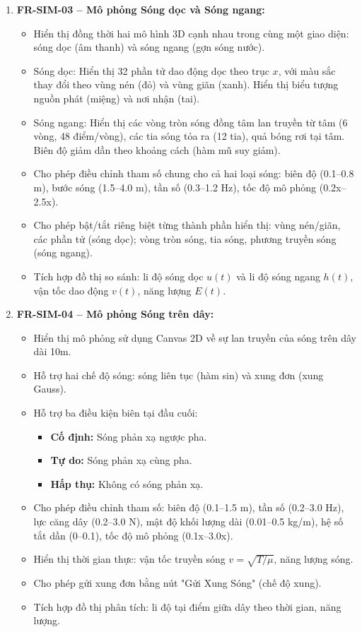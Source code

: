 \begin{enumerate}
    \item \textbf{FR-SIM-03 – Mô phỏng Sóng dọc và Sóng ngang:}
    \begin{itemize}
        \item Hiển thị đồng thời hai mô hình 3D cạnh nhau trong cùng một giao diện: sóng dọc (âm thanh) và sóng ngang (gợn sóng nước).
        \item Sóng dọc: Hiển thị 32 phần tử dao động dọc theo trục $x$, với màu sắc thay đổi theo vùng nén (đỏ) và vùng giãn (xanh). Hiển thị biểu tượng nguồn phát (miệng) và nơi nhận (tai).
        \item Sóng ngang: Hiển thị các vòng tròn sóng đồng tâm lan truyền từ tâm (6 vòng, 48 điểm/vòng), các tia sóng tỏa ra (12 tia), quả bóng rơi tại tâm. Biên độ giảm dần theo khoảng cách (hàm mũ suy giảm).
        \item Cho phép điều chỉnh tham số chung cho cả hai loại sóng: biên độ (0.1–0.8 m), bước sóng (1.5–4.0 m), tần số (0.3–1.2 Hz), tốc độ mô phỏng (0.2x–2.5x).
        \item Cho phép bật/tắt riêng biệt từng thành phần hiển thị: vùng nén/giãn, các phần tử (sóng dọc); vòng tròn sóng, tia sóng, phương truyền sóng (sóng ngang).
        \item Tích hợp đồ thị so sánh: li độ sóng dọc $u(t)$ và li độ sóng ngang $h(t)$, vận tốc dao động $v(t)$, năng lượng $E(t)$.
    \end{itemize}
    
    \item \textbf{FR-SIM-04 – Mô phỏng Sóng trên dây:}
    \begin{itemize}
        \item Hiển thị mô phỏng sử dụng Canvas 2D về sự lan truyền của sóng trên dây dài 10m.
        \item Hỗ trợ hai chế độ sóng: sóng liên tục (hàm sin) và xung đơn (xung Gauss).
        \item Hỗ trợ ba điều kiện biên tại đầu cuối:
        \begin{itemize}
            \item \textbf{Cố định:} Sóng phản xạ ngược pha.
            \item \textbf{Tự do:} Sóng phản xạ cùng pha.
            \item \textbf{Hấp thụ:} Không có sóng phản xạ.
        \end{itemize}
        \item Cho phép điều chỉnh tham số: biên độ (0.1–1.5 m), tần số (0.2–3.0 Hz), lực căng dây (0.2–3.0 N), mật độ khối lượng dài (0.01–0.5 kg/m), hệ số tắt dần (0–0.1), tốc độ mô phỏng (0.1x–3.0x).
        \item Hiển thị thời gian thực: vận tốc truyền sóng $v = \sqrt{T/\mu}$, năng lượng sóng.
        \item Cho phép gửi xung đơn bằng nút "Gửi Xung Sóng" (chế độ xung).
        \item Tích hợp đồ thị phân tích: li độ tại điểm giữa dây theo thời gian, năng lượng.
    \end{itemize}
    

\end{enumerate}
